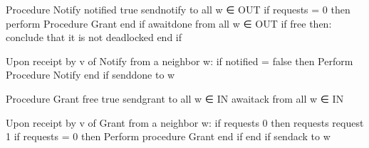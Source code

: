 \documentclass[letterpaper,10pt,english]{sphinxmanual}
\begin{document}
\def\sphinxLiteralBlockLabel{\label{\detokenize{docs/BrachaToueg/algorithm:id12}}\label{\detokenize{docs/BrachaToueg/algorithm:brachatouegdeadlockdetectionalgorithm}}}
\begin{sphinxVerbatim}[commandchars=\\\{\},numbers=left,firstnumber=1,stepnumber=1]
Procedure Notify
notified \PYGZlt{}\PYGZhy{} true
send\PYGZlt{}notify\PYGZgt{} to all w ∈  OUT
if requests = 0 then
        perform Procedure Grant
    end if
await\PYGZlt{}done\PYGZgt{} from all w ∈ OUT
if free then:
    conclude that it is not deadlocked
end if

Upon receipt by v of Notify from a neighbor w:
if notified = false then
        Perform Procedure Notify
end if
send\PYGZlt{}done\PYGZgt{} to w

Procedure Grant
free \PYGZlt{}\PYGZhy{} true
send\PYGZlt{}grant\PYGZgt{} to all w ∈ IN
await\PYGZlt{}ack\PYGZgt{} from all w ∈ IN

Upon receipt by v of Grant from a neighbor w:
if requests \PYGZgt{} 0 then
        requests \PYGZlt{}\PYGZhy{} request \PYGZhy{} 1
    if requests = 0 then
            Perform procedure Grant
        end if
end if
send\PYGZlt{}ack\PYGZgt{} to w
\end{sphinxVerbatim}
\end{document}
